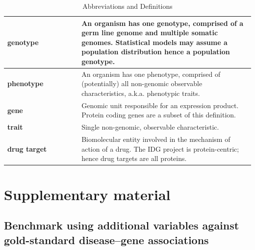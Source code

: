 \begin{table}
\caption{Abbreviations and Definitions}
\begin{center}
\begin{tabular}{|p{0.3\linewidth}|p{0.7\linewidth}|}
\hline
\textbf{genotype}
& An organism has one genotype, comprised of a germ line genome and multiple somatic genomes. Statistical models may assume a population distribution hence a population genotype. \\
\hline
\textbf{phenotype}
& An organism has one phenotype, comprised of (potentially) all non-genomic observable characteristics, a.k.a. phenotypic traits. \\
\hline
\textbf{gene}
& Genomic unit responsible for an expression product. Protein coding genes are a subset of this definition.  \\
\hline
\textbf{trait}
& Single non-genomic, observable characteristic. \\
\hline
\textbf{drug target}
& Biomolecular entity involved in the mechanism of action of a drug. The IDG project is protein-centric; hence drug targets are all proteins. \\
\hline
\end{tabular}
\end{center}
\end{table}

\section{Supplementary material}

\subsection{Benchmark using additional variables against gold-standard disease–gene associations}

